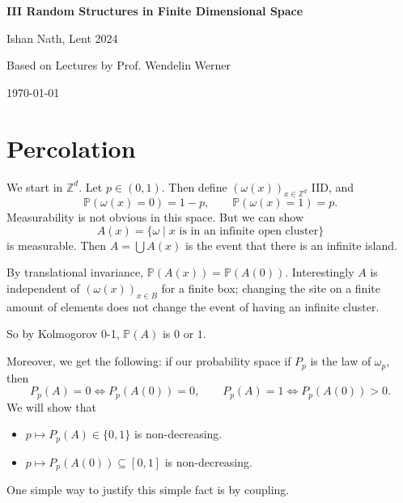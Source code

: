 \documentclass[12pt]{article}
\begin{document}
\hypersetup{pageanchor=false}
\begin{titlepage}
	\begin{center}
		\vspace*{1em}
		\Huge
		\textbf{III Random Structures in Finite Dimensional Space}

		\vspace{1em}
		\large
		Ishan Nath, Lent 2024

		\vspace{1.5em}

		\Large

		Based on Lectures by Prof. Wendelin Werner

		\vspace{1em}

		\large
		\today
	\end{center}
	
\end{titlepage}
\hypersetup{pageanchor=true}

\tableofcontents

\newpage


\section{Percolation}%
\label{sec:p}

We start in $\mathbb{Z}^d$. Let $p \in (0, 1)$. Then define $(\omega(x))_{x \in \mathbb{Z}^d}$ IID, and
\[
\mathbb{P}(\omega(x) = 0) = 1 - p, \qquad \mathbb{P}(\omega(x) = 1) = p.
\]
Measurability is not obvious in this space. But we can show
\[
	A(x) = \{\omega \mid x \text{ is in an infinite open cluster}\}
\]
is measurable. Then $A = \bigcup A(x)$ is the event that there is an infinite island.

By translational invariance, $\mathbb{P}(A(x)) = \mathbb{P}(A(0))$. Interestingly $A$ is independent of $(\omega(x))_{x \in B}$ for a finite box; changing the site on a finite amount of elements does not change the event of having an infinite cluster.

So by Kolmogorov 0-1, $\mathbb{P}(A)$ is $0$ or $1$.


Moreover, we get the following: if our probability space if $P_p$ is the law of $\omega_p$, then
\[
P_p(A) = 0 \iff P_p(A(0)) = 0, \qquad P_p(A) = 1 \iff P_p(A(0)) > 0.
\]
We will show that
\begin{itemize}
	\item $p \mapsto P_p(A) \in \{0, 1\}$ is non-decreasing.
	\item $p \mapsto P_p(A(0)) \subseteq [0, 1]$ is non-decreasing.
\end{itemize}
One simple way to justify this simple fact is by coupling.
\end{document}
